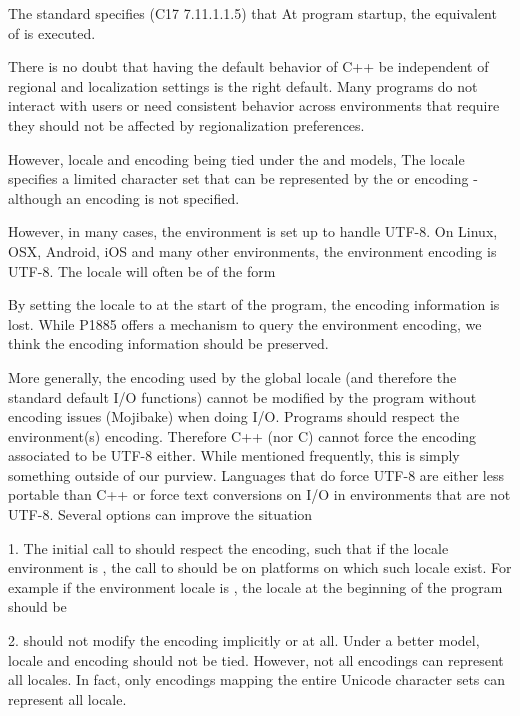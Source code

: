 \documentclass{wg21}
\begin{document}
The \cite{C} standard specifies (C17 7.11.1.1.5) that
At program startup, the equivalent of  is executed.

There is no doubt that having the default behavior of C++ be independent of regional and localization settings is the right default.
Many programs do not interact with users or need consistent behavior across environments that require they should not be affected by regionalization preferences.

However, locale and encoding being tied under the  and  models,
The  locale specifies a limited character set that can be represented by the  or  encoding - although an encoding is not specified.

However, in many cases, the environment is set up to handle UTF-8.
On Linux, OSX, Android, iOS and many other environments, the environment encoding is UTF-8. The locale will often be of the form 

By setting the locale to  at the start of the program, the encoding information is lost.
While P1885 \cite{P1885R0} offers a mechanism to query the environment encoding, we think the encoding information should be preserved.

More generally, the encoding used by the global locale (and therefore the standard default I/O functions) cannot be modified by the program without encoding issues (Mojibake) when doing I/O.
Programs should respect the environment(s) encoding.
Therefore C++ (nor C) cannot force the encoding associated to be UTF-8 either. 
While mentioned frequently, this is simply something outside of our purview.
Languages that do force UTF-8 are either less portable than C++ or force text conversions on I/O in environments that are not UTF-8.
Several options can improve the situation

1.  The initial call to  should respect the encoding, such that if the locale environment is , the call to  should be  on platforms on which  such locale exist.
For example if the environment locale is , the locale at the beginning of the program should be 

2.  should not modify the encoding implicitly or at all. Under a better model, locale and encoding should not be tied.
However, not all encodings can represent all locales.
In fact, only encodings mapping the entire Unicode character sets can represent all locale.
\end{document}

